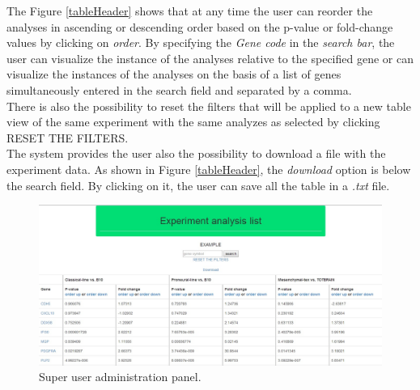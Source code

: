 \documentclass[a4paper]{report}
\begin{document}
The Figure \ref{tableHeader} shows that at any time the user can reorder the analyses  in ascending or descending order based on the p-value or fold-change values by clicking on \emph{order}. By specifying the \emph{Gene code} in the \emph{search bar}, the user can visualize the instance of the analyses relative to the specified gene or can visualize the instances of the analyses on the basis of a list of genes simultaneously entered in the search field and separated by a comma.\\
There is also the possibility to reset the filters that will be applied to a new table view of the same experiment with the same analyzes as selected by clicking RESET THE FILTERS.\\
The system provides the user also the possibility to download a file with the experiment data. As shown in Figure \ref{tableHeader}, the \emph{download} option is below the search field. By clicking on it, the user can save all the table in a \emph{.txt} file.


\begin{figure}[htb] 
\begin{center}
\includegraphics[scale=0.4]{figure/table.jpg} 
\end{center}
\caption{Super user administration panel.}
\label{table}
\end{figure}
\end{document}
